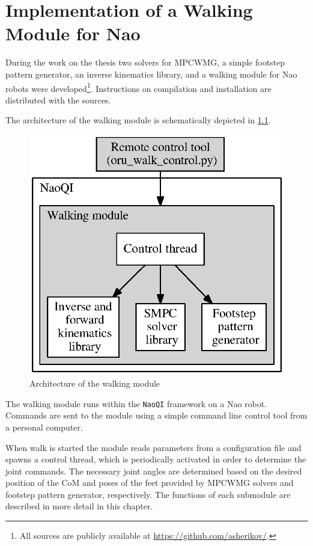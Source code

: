 \chapter{Implementation of a Walking Module for Nao}
\label{ch.naomodule}
During the work on the thesis two solvers for \ac{MPCWMG}, a simple footstep pattern
generator, an inverse kinematics library, and a walking module for Nao robots were 
developed\footnote{All sources are publicly available at \url{https://github.com/asherikov/}.}. 
Instructions on compilation and installation are distributed with the sources.

The architecture of the walking module is schematically depicted in \cref{fig.arch}.

\begin{figure}[ht]
    \centerline{%
    \includegraphics[scale=0.6]{Figures/nao_mod_arch.eps}}
    \caption{Architecture of the walking module}
    \label{fig.arch}
\end{figure}

The walking module runs within the \verb|NaoQI| framework on a Nao robot. Commands 
are sent to the module using a simple command line control tool from a personal 
computer.

When walk is started the module reads parameters from a configuration file and
spawns a control thread, which is periodically activated in order to determine
the joint commands. The necessary joint angles are determined based on the 
desired position of the \ac{CoM} and poses of the feet provided by \ac{MPCWMG}
solvers and footstep pattern generator, respectively. The functions of each submodule
are described in more detail in this chapter.

